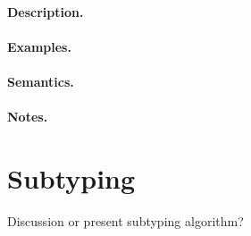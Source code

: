 \paragraph{Description.}

\paragraph{Examples.}

\paragraph{Semantics.}

\paragraph{Notes.}

\section{Subtyping}
Discussion or present subtyping algorithm?

